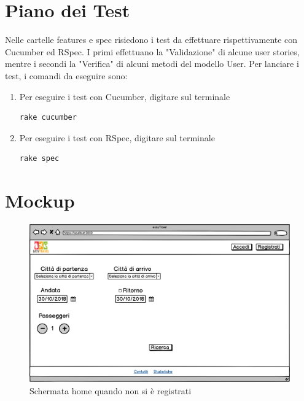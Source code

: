 \documentclass[11pt]{article}
\begin{document}
\section{Piano dei Test}
Nelle cartelle features e spec risiedono i test da effettuare rispettivamente con Cucumber ed RSpec. I primi effettuano la "Validazione" di alcune user stories, mentre i secondi la "Verifica" di alcuni metodi del modello User.
Per lanciare i test, i comandi da eseguire sono:
\begin{enumerate}
	\item Per eseguire i test con Cucumber, digitare sul terminale \begin{verbatim}rake cucumber\end{verbatim}
	\item Per eseguire i test con RSpec, digitare sul terminale \begin{verbatim}rake spec\end{verbatim}
\end{enumerate}
\pagebreak


\section{Mockup}
\begin{figure}[!ht]
	\includegraphics[width=1\textwidth]{./Mockup/Home-non-registrato} %
	\caption{Schermata home quando non si è registrati}
	\label{fig:homenotreg}
\end{figure}
\end{document}

